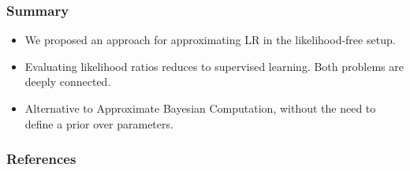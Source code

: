 \documentclass{beamer}
\begin{document}
\begin{frame}
    \frametitle{Summary}

    \begin{itemize}
        \item We proposed an approach for approximating LR in the likelihood-free setup.

        \item Evaluating likelihood ratios reduces to supervised learning. Both problems are deeply connected.

        \item Alternative to Approximate Bayesian Computation, without the need to define a prior over parameters.
    \end{itemize}
\end{frame}

\begin{frame}
    \frametitle{References}
    {\footnotesize
    
    }
\end{frame}
\end{document}
